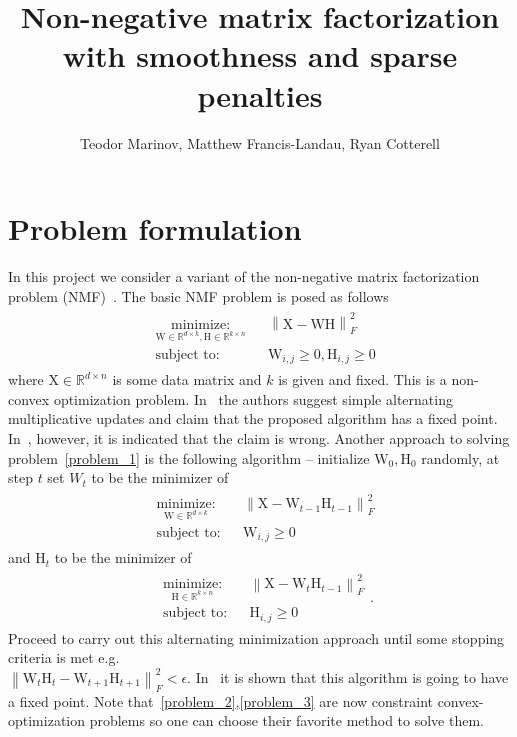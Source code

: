 \documentclass{article}
\newcommand{\0}{\mathrm{0}}
\newcommand{\1}{\mathrm{1}}
\renewcommand{\H}{\mathrm{H}}
\newcommand{\W}{\mathrm{W}}
\newcommand{\X}{\mathrm{X}}
\newcommand{\norm}[1]{\left\| #1 \right\|}
\newcommand{\minimize}[3]{
\begin{aligned}
& \underset{#1}{\textrm{minimize:}}
& & #2 \\
& \textrm{subject to:}
& &  #3
\end{aligned}
}
\begin{document}
\title{Non-negative matrix factorization with smoothness and sparse penalties}
\author{Teodor Marinov, Matthew Francis-Landau, Ryan Cotterell}
\date{}

\maketitle
\section{Problem formulation}
In this project we consider a variant of the non-negative matrix factorization problem (NMF)~\cite{lee2001algorithms}. The basic NMF problem is posed as follows
\begin{equation}\label{problem_1}
  \begin{aligned}
    \minimize{\W\in \mathbb{R}^{d\times k},\H \in \mathbb{R}^{k\times n}}{\norm{\X - \W\H}_F^2}{\W_{i,j} \geq 0,\H_{i,j}\geq 0}
  \end{aligned}
\end{equation}
where $\X\in\mathbb{R}^{d\times n}$ is some data matrix and $k$ is given and fixed. This is a non-convex optimization problem. In~\cite{lee2001algorithms} the authors suggest simple alternating multiplicative updates and claim that the proposed algorithm has a fixed point. In~\cite{gonzalez2005accelerating}, however, it is indicated that the claim is wrong. Another approach to solving problem~\ref{problem_1} is the following algorithm -- initialize $\W_0,\H_0$ randomly, at step $t$ set $W_{t}$ to be the minimizer of
\begin{equation}\label{problem_2}
  \begin{aligned}
    \minimize{\W\in \mathbb{R}^{d\times k}}{\norm{\X - \W_{t-1}\H_{t-1}}_F^2}{\W_{i,j} \geq 0}
  \end{aligned}
\end{equation}
and $\H_t$ to be the minimizer of
\begin{equation}\label{problem_3}
  \begin{aligned}
    \minimize{\H\in \mathbb{R}^{k\times n}}{\norm{\X - \W_{t}\H_{t-1}}_F^2}{\H_{i,j} \geq 0}.
  \end{aligned}
\end{equation}
Proceed to carry out this alternating minimization approach until some stopping criteria is met e.g.\\ $\norm{\W_t\H_t - \W_{t+1}\H_{t+1}}_F^2 < \epsilon$. In~\cite{tropp2003alternating} it is shown that this algorithm is going to have a fixed point. Note that~\ref{problem_2},\ref{problem_3} are now constraint convex-optimization problems so one can choose their favorite method to solve them.
\end{document}
